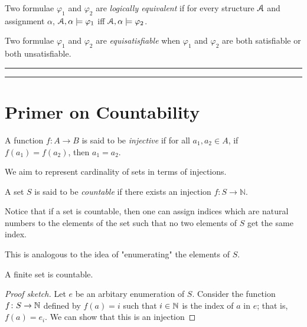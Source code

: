 \documentclass[11pt,usenames, dvipsnames]{article}
\begin{document}
\begin{definition}
  Two formulae $\varphi_1$ and $\varphi_2$ are \emph{logically equivalent} if for every structure $\struct$ and assignment $\alpha$, $\struct, \alpha \models \varphi_1$ iff $\struct, \alpha \models \varphi_2$.
\end{definition}

\begin{definition}[Equisatisfiability]
  Two formulae $\varphi_1$ and $\varphi_2$ are \emph{equisatisfiable} when $\varphi_1$ and $\varphi_2$ are both satisfiable or both unsatisfiable.
\end{definition}

\vspace{5truemm}
\hrule
\hrule

\section*{\large \centering Primer on Countability}
\noindent

\begin{definition}[Injection]
  A function $f \colon A \to B$ is said to be \emph{injective} if for all $a_1, a_2 \in A$, if $f(a_1) = f(a_2)$, then $a_1 = a_2$.
\end{definition}

We aim to represent cardinality of sets in terms of injections.

\begin{definition}
  A set $S$ is said to be \emph{countable} if there exists an injection $f \colon S \to \mathbb{N}$.
\end{definition}

Notice that if a set is countable, then one can assign indices which are natural numbers to the elements of the set such that no two elements of $S$ get the same index.

This is analogous to the idea of "enumerating" the elements of $S$.

\begin{claim}
  A finite set is countable.
\end{claim}

\begin{proof}[Proof sketch]
  Let $e$ be an arbitary enumeration of $S$. Consider the function $f \colon S \to \mathbb{N}$ defined by $f(a) = i$ such that $i \in \mathbb{N}$ is the index of $a$ in $e$; that is, $f(a) = e_i$. We can show that this is an injection
\end{proof}
\end{document}
